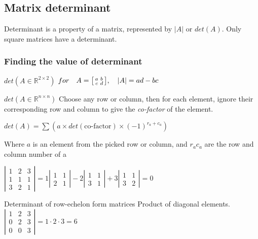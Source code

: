\documentclass{article}
\begin{document}
\subsection{Matrix determinant}
Determinant is a property of a matrix, represented by $|A|$ or $det(A)$. Only square matrices have a determinant.
\subsubsection{Finding the value of determinant}
\begin{knBox}[]{$det(A\in \mathds{R}^{2\times 2})$}
    $for\quad A=\begin{bsmallmatrix}
        a&b\\c&d
    \end{bsmallmatrix},\quad |A| = ad - bc$
\end{knBox}
\begin{knBox}[]{$det(A\in \mathds{R}^{n\times n})$}
    Choose any row or column, then for each element, ignore their corresponding row and column to give the \emph{co-factor} of the element. 

    $det(A) = \sum(a\times det(\text{co-factor})\times (-1)^{r_a+c_a})$

    Where $a$ is an element from the picked row or column, and $r_a c_a$ are the row and column number of a

    \tcblower

    $|\begin{smallmatrix}1&2&3\\1&1&1\\3&2&1\end{smallmatrix}|=1|\begin{smallmatrix}
        1&1\\2&1
    \end{smallmatrix}|-2|\begin{smallmatrix}
        1&1\\3&1
    \end{smallmatrix}|+3|\begin{smallmatrix}
        1&1\\3&2
    \end{smallmatrix}|=0$

\end{knBox}
\begin{knBox}[]{Determinant of row-echelon form matrices}
    Product of diagonal elements.
    $|\begin{smallmatrix}
        1&2&3\\0&2&3\\0&0&3
    \end{smallmatrix}|=1\cdot 2\cdot 3=6$
\end{knBox}
\end{document}
